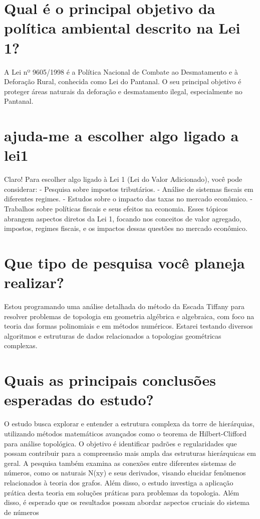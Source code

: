 \documentclass[11pt,a4paper]{article}
\begin{document}
\section{Qual é o principal objetivo da política ambiental descrito na Lei 1?}
A Lei nº 9605/1998 é a Política Nacional de Combate ao Desmatamento e à Deforação Rural, conhecida como Lei do Pantanal. O seu principal objetivo é proteger áreas naturais da deforação e desmatamento ilegal, especialmente no Pantanal.

\section{ajuda-me a escolher algo ligado a lei1}
Claro! Para escolher algo ligado à Lei 1 (Lei do Valor Adicionado), você pode considerar: - Pesquisa sobre impostos tributários. - Análise de sistemas fiscais em diferentes regimes. - Estudos sobre o impacto das taxas no mercado econômico. - Trabalhos sobre políticas fiscais e seus efeitos na economia. Esses tópicos abrangem aspectos diretos da Lei 1, focando nos conceitos de valor agregado, impostos, regimes fiscais, e os impactos dessas questões no mercado econômico.

\section{Que tipo de pesquisa você planeja realizar?}
Estou programando uma análise detalhada do método da Escada Tiffany para resolver problemas de topologia em geometria algébrica e algebraica, com foco na teoria das formas polinomiais e em métodos numéricos. Estarei testando diversos algoritmos e estruturas de dados relacionados a topologias geométricas complexas.

\section{Quais as principais conclusões esperadas do estudo?}
O estudo busca explorar e entender a estrutura complexa da torre de hierárquias, utilizando métodos matemáticos avançados como o teorema de Hilbert-Clifford para análise topológica. O objetivo é identificar padrões e regularidades que possam contribuir para a compreensão mais ampla das estruturas hierárquicas em geral. A pesquisa também examina as conexões entre diferentes sistemas de números, como os naturais N(xy) e seus derivados, visando elucidar fenômenos relacionados à teoria dos grafos. Além disso, o estudo investiga a aplicação prática desta teoria em soluções práticas para problemas da topologia. Além disso, é esperado que os resultados possam abordar aspectos cruciais do sistema de números
\end{document}
